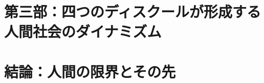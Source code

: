 
\newpage

\newpage



\newpage

\newpage

\newpage



\newpage

\newpage

\newpage


\chapter{第三部：四つのディスクールが形成する人間社会のダイナミズム}


\newpage

\newpage



\newpage

\newpage



\newpage

\newpage

\newpage


\chapter{結論：人間の限界とその先}


\newpage


\newpage


\newpage


\newpage


\newpage


